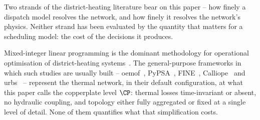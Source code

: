 
Two strands of the district-heating literature bear on this paper -- how finely a
dispatch model resolves the network, and how finely it resolves the network's physics.
Neither strand has been evaluated by the quantity that matters for a scheduling model:
the cost of the decisions it produces.

Mixed-integer linear programming is the dominant methodology for operational
optimisation of district-heating systems~\cite{Fang2016}. The general-purpose
frameworks in which such studies are usually built -- oemof~\cite{Hilpert2018_oemof},
PyPSA~\cite{Brown2018_pypsa}, FINE~\cite{Welder2018_FINE},
Calliope~\cite{Pfenninger2018_calliope} and urbs~\cite{Dorfner2016_urbs} --
represent the thermal network, in their default configuration, at what this paper calls
the copperplate level $\CP$: thermal losses time-invariant or absent, no hydraulic
coupling, and topology either fully aggregated or fixed at a single level of detail.
None of them quantifies what that simplification costs.

